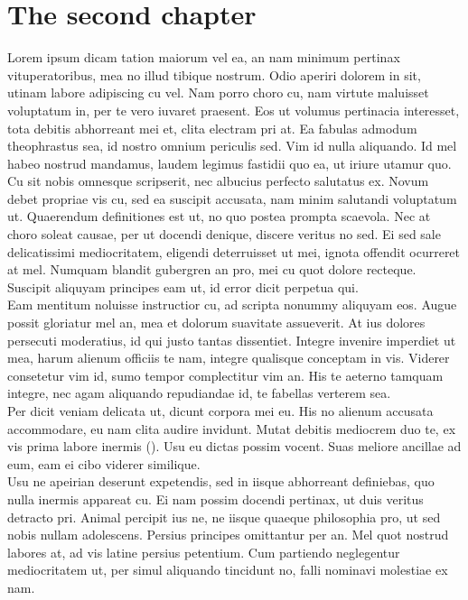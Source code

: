 \chapter{The second chapter}

Lorem ipsum dicam tation maiorum vel ea, an nam minimum pertinax vituperatoribus, mea no illud tibique nostrum. Odio aperiri dolorem in sit, utinam labore adipiscing cu vel. Nam porro choro cu, nam virtute maluisset voluptatum in, per te vero iuvaret praesent. Eos ut volumus pertinacia interesset, tota debitis abhorreant mei et, clita electram pri at. Ea fabulas admodum theophrastus sea, id nostro omnium periculis sed. Vim id nulla aliquando. Id mel habeo nostrud mandamus, laudem legimus fastidii quo ea, ut iriure utamur quo.\\

Cu sit nobis omnesque scripserit, nec albucius perfecto salutatus ex. Novum debet propriae vis cu, sed ea suscipit accusata, nam minim salutandi voluptatum ut. Quaerendum definitiones est ut, no quo postea prompta scaevola. Nec at choro soleat causae, per ut docendi denique, discere veritus no sed. Ei sed sale delicatissimi  mediocritatem, eligendi deterruisset ut mei, ignota offendit ocurreret at mel. Numquam blandit gubergren an pro, mei cu quot dolore recteque. Suscipit aliquyam principes eam ut, id error dicit perpetua qui.\\

Eam mentitum noluisse instructior cu, ad scripta nonummy aliquyam eos. Augue possit gloriatur mel an, mea et dolorum suavitate assueverit. At ius dolores persecuti moderatius, id qui justo tantas dissentiet. Integre invenire imperdiet ut mea, harum alienum officiis te nam, integre qualisque conceptam in vis. Viderer  consetetur vim id, sumo tempor complectitur vim an. His te aeterno tamquam integre, nec agam aliquando repudiandae id, te fabellas verterem sea.\\

Per dicit veniam delicata ut, dicunt corpora mei eu. His no alienum accusata accommodare, eu nam clita audire invidunt. Mutat debitis mediocrem duo te, ex vis prima labore inermis \citeauthor{Aly2012} (\citeyear{Aly2012}). Usu eu dictas possim vocent. Suas meliore ancillae ad eum, eam ei cibo viderer similique.\\

Usu ne apeirian deserunt expetendis, sed in iisque abhorreant definiebas, quo nulla inermis appareat cu. Ei nam possim docendi pertinax, ut duis veritus detracto pri. Animal percipit ius ne, ne iisque quaeque philosophia pro, ut sed nobis nullam adolescens. Persius principes omittantur per an. Mel quot nostrud labores at, ad vis latine persius petentium. Cum partiendo neglegentur mediocritatem ut, per simul aliquando tincidunt no, falli nominavi molestiae ex nam.\\

